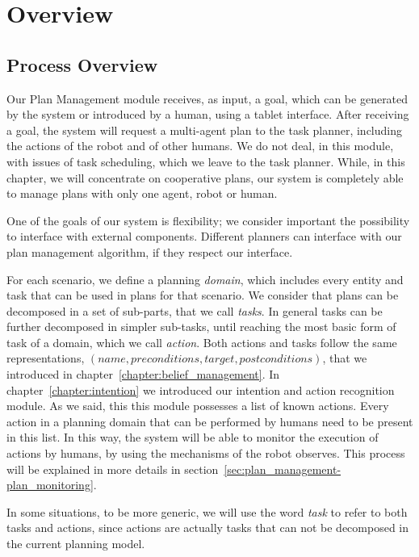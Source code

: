 \section{Overview}
\label{sec:plan_management-overview}

\subsection{Process Overview}
Our Plan Management module receives, as input, a goal, which can be generated by the system or introduced by a human, using a tablet interface. After receiving a goal, the system will request a multi-agent plan to the task planner, including the actions of the robot and of other humans. We do not deal, in this module, with issues of task scheduling, which we leave to the task planner. While, in this chapter, we will concentrate on cooperative plans, our system is completely able to manage plans with only one agent, robot or human. 

One of the goals of our system is flexibility; we consider important the possibility to interface with external components. Different planners can interface with our plan management algorithm, if they respect our interface.

For each scenario, we define a planning \textit{domain}, which includes every entity and task that can be used in plans for that scenario. We consider that plans can be decomposed in a set of sub-parts, that we call \textit{tasks}. In general tasks can be further decomposed in simpler sub-tasks, until reaching the most basic form of task of a domain, which we call \textit{action}. Both actions and tasks follow the same representations, $(name,preconditions,target,postconditions)$, that we introduced in chapter~\ref{chapter:belief_management}. In chapter~\ref{chapter:intention} we introduced our intention and action recognition module. As we said, this this module possesses a list of known actions. Every action in a planning domain that can be performed by humans need to be present in this list. In this way, the system will be able to monitor the execution of actions by humans, by using the mechanisms of the robot observes. This process will be explained in more details in section~\ref{sec:plan_management-plan_monitoring}.

In some situations, to be more generic, we will use the word \textit{task} to refer to both tasks and actions, since actions are actually tasks that can not be decomposed in the current planning model.

